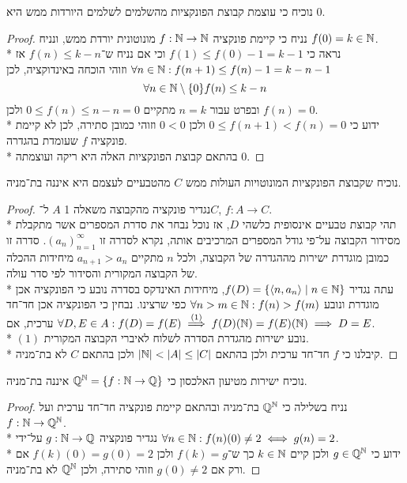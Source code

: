 \Subquestion{}
נוכיח כי עוצמת קבוצת הפונקציות מהשלמים לשלמים היורדות ממש היא $0$.
\begin{proof}
	נניח כי קיימת פונקציה $f : \mathbb{N} \to \mathbb{N}$ מונוטונית יורדת ממש, ונניח $f(0) = k \in \mathbb{N}$. \\*
	נראה כי $f(1) \le f(0) - 1 = k - 1$ וכי אם נניח ש־$f(n) \le k - n$ אז $\forall n \in \mathbb{N} : f(n + 1) \le f(n) - 1 = k - n - 1$ וזוהי הוכחה באינדוקציה, לכן
	\[
		\forall n \in \mathbb{N}\setminus\{0\} f(n) \le k - n
	\]
	ובפרט עבור $n = k$ מתקיים $0 \le f(n) \le n - n = 0$ ולכן $f(n) = 0$. \\*
	ידוע כי $0 \le f(n + 1) < f(n) = 0$ ולכן $0 < 0$ וזוהי כמובן סתירה, לכן לא קיימת פונקציה $f$ שעומדת בהגדרה. \\*
	בהתאם קבוצת הפונקציות האלה היא ריקה ועוצמתה $0$.
\end{proof}

\Subquestion{}
נוכיח שקבוצת הפונקציות המונוטויות העולות ממש $C$ מהטבעיים לעצמם היא איננה בת־מניה.
\begin{proof}
	נגדיר פונקציה מהקבוצה משאלה 1 $A$ ל־$C$, $f : A \to C$. \\*
	תהי קבוצת טבעיים אינסופית כלשהי $D$, אז נוכל נבחר את סדרת המספרים אשר מתקבלת מסידור הקבוצה על־פי גודל המספרים המרכיבים אותה, נקרא לסדרה זו ${(a_n)}_{n = 1}^\infty$. 
	סדרה זו כמובן מוגדרת ישירות מההגדרה של הקבוצה, ולכל $n$ מתקיים $a_{n + 1} > a_n$ מיחידות ההכלה של הקבוצה המקורית והסידור לפי סדר עולה. \\*
	עתה נגדיר $f(D) = \{ \langle n, a_n \rangle \mid n \in \mathbb{N} \}$, מיחידות האינדקס בסדרה נובע כי הפונקציה אכן מוגדרת ונובע $\forall n > m \in \mathbb{N} : f(n) > f(m)$ כפי שרצינו.
	נבחין כי הפונקציה אכן חד־חד ערכית, אם $\forall D, E \in A : f(D) = f(E) \overset{(1)}{\implies} f(D)(\mathbb{N}) = f(E)(\mathbb{N}) \implies D = E$. \\*
	$(1)$ נובע ישירות מהגדרת הסדרה לשלוח לאיברי הקבוצה המקורית. \\*
	קיבלנו כי $f$ חד־חד ערכית ולכן בהתאם $|\mathbb{N}| < |A| \le |C|$ ולכן בהתאם $C$ לא בת־מניה.
\end{proof}

\Question{}
\Subquestion{}
נוכיח ישירות מטיעון האלכסון כי $\mathbb{Q}^{\mathbb{N}} = \{ f : \mathbb{N} \to \mathbb{Q}\}$ איננה בת־מניה.
\begin{proof}
	נניח בשלילה כי $\mathbb{Q}^{\mathbb{N}}$ בת־מניה ובהתאם קיימת פונקציה חד־חד ערכית ועל $f : \mathbb{N} \to \mathbb{Q}^{\mathbb{N}}$. \\*
	נגדיר פונקציה $g : \mathbb{N} \to \mathbb{Q}$ על־ידי $\forall n \in \mathbb{N} : f(n)(0) \ne 2 \iff g(n) = 2$. \\*
	ידוע כי $g \in \mathbb{Q}^{\mathbb{N}}$ ולכן קיים $k \in \mathbb{N}$ כך ש־$f(k) = g$ ולכן $f(k)(0) = g(0) = 2$ אם ורק אם $g(0) \ne 2$ וזוהי סתירה, ולכן $\mathbb{Q}^{\mathbb{N}}$ לא בת־מניה.
\end{proof}

